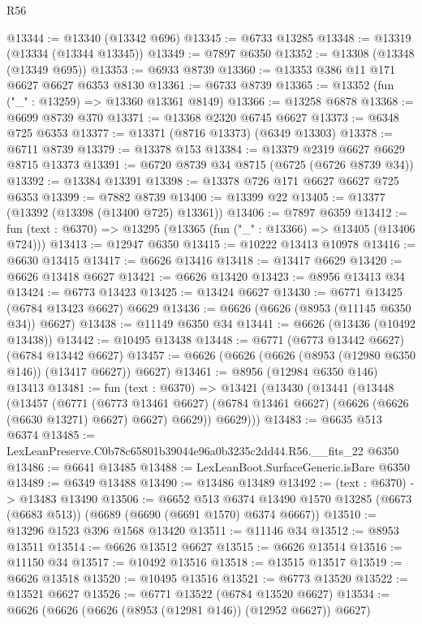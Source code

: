 \begin{lexlean}{R56}
\begin{coremodule}
@13344 := @13340 (@13342 @696)
@13345 := @6733 @13285
@13348 := @13319 (@13334 (@13344 @13345))
@13349 := @7897 @6350
@13352 := @13308 (@13348 (@13349 @695))
@13353 := @6933 @8739
@13360 := @13353 @386 @11 @171 @6627 @6627 @6353 @8130
@13361 := @6733 @8739
@13365 := @13352 (fun ("_" : @13259) => @13360 @13361 @8149)
@13366 := @13258 @6878
@13368 := @6699 @8739 @370
@13371 := @13368 @2320 @6745 @6627
@13373 := @6348 @725 @6353
@13377 := @13371 (@8716 @13373) (@6349 @13303)
@13378 := @6711 @8739
@13379 := @13378 @153
@13384 := @13379 @2319 @6627 @6629 @8715 @13373
@13391 := @6720 @8739 @34 @8715 (@6725 (@6726 @8739 @34))
@13392 := @13384 @13391
@13398 := @13378 @726 @171 @6627 @6627 @725 @6353
@13399 := @7882 @8739
@13400 := @13399 @22
@13405 := @13377 (@13392 (@13398 (@13400 @725) @13361))
@13406 := @7897 @6359
@13412 := fun (text : @6370) => @13295 (@13365 (fun ("_" : @13366) => @13405 (@13406 @724)))
@13413 := @12947 @6350
@13415 := @10222 @13413 @10978
@13416 := @6630 @13415
@13417 := @6626 @13416
@13418 := @13417 @6629
@13420 := @6626 @13418 @6627
@13421 := @6626 @13420
@13423 := @8956 @13413 @34
@13424 := @6773 @13423
@13425 := @13424 @6627
@13430 := @6771 @13425 (@6784 @13423 @6627) @6629
@13436 := @6626 (@6626 (@8953 (@11145 @6350 @34)) @6627)
@13438 := @11149 @6350 @34
@13441 := @6626 (@13436 (@10492 @13438))
@13442 := @10495 @13438
@13448 := @6771 (@6773 @13442 @6627) (@6784 @13442 @6627)
@13457 := @6626 (@6626 (@6626 (@8953 (@12980 @6350 @146)) (@13417 @6627)) @6627)
@13461 := @8956 (@12984 @6350 @146) @13413
@13481 := fun (text : @6370) =>
  @13421
    (@13430
      (@13441
        (@13448
          (@13457
            (@6771
              (@6773 @13461 @6627)
              (@6784 @13461 @6627)
              (@6626 (@6626 (@6630 @13271) @6627) @6627)
              @6629))
          @6629)))
@13483 := @6635 @513 @6374
@13485 := LexLeanPreserve.C0b78c65801b39044e96a0b3235c2dd44.R56.__fits_22 @6350
@13486 := @6641 @13485
@13488 := LexLeanBoot.SurfaceGeneric.isBare @6350
@13489 := @6349 @13488
@13490 := @13486 @13489
@13492 := (text : @6370) -> @13483 @13490
@13506 := @6652
    @513
    @6374
    @13490
    @1570
    @13285
    (@6673 (@6683 @513))
    (@6689 (@6690 (@6691 @1570) @6374 @6667))
@13510 := @13296 @1523 @396 @1568 @13420
@13511 := @11146 @34
@13512 := @8953 @13511
@13514 := @6626 @13512 @6627
@13515 := @6626 @13514
@13516 := @11150 @34
@13517 := @10492 @13516
@13518 := @13515 @13517
@13519 := @6626 @13518
@13520 := @10495 @13516
@13521 := @6773 @13520
@13522 := @13521 @6627
@13526 := @6771 @13522 (@6784 @13520 @6627)
@13534 := @6626 (@6626 (@6626 (@8953 (@12981 @146)) (@12952 @6627)) @6627)

\end{coremodule}
\end{lexlean}

